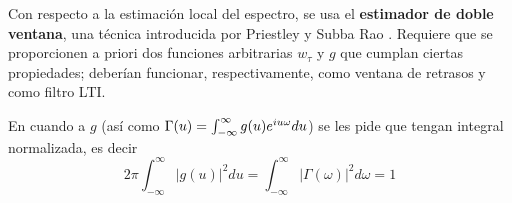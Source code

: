 

Con respecto a la estimaci\'on local del espectro, se usa el \textbf{estimador de doble ventana},
una t\'ecnica introducida por Priestley y Subba Rao \cite{Priestley69}.
Requiere que se proporcionen a priori dos funciones arbitrarias $w_\tau$ y $g$ que cumplan ciertas
propiedades; deber\'ian funcionar, respectivamente, como ventana de retrasos y como
filtro LTI.


En cuando a $g$ (as\'i como $\Gamma(u) = \int_{-\infty}^{\infty} g(u) e^{i u \omega} du$) se les pide que tengan 
integral normalizada, es decir
\begin{equation*}
2\pi \int_{-\infty}^{\infty} \lvert g(u) \lvert^{2} du 
= 
\int_{-\infty}^{\infty} \lvert \Gamma(\omega) \lvert^{2} d\omega
= 1
\end{equation*}

